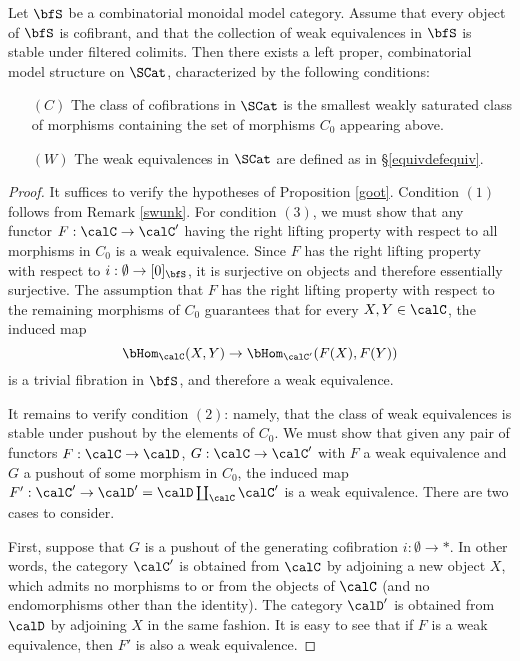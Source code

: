 \begin{Simplicial Categories}
\begin{proposition}\label{enrichcatper}
Let $\bfS$ be a combinatorial monoidal model category. Assume that every object of
$\bfS$ is cofibrant, and that the collection of weak equivalences in $\bfS$ is stable
under filtered colimits. Then
there exists a left proper, combinatorial model structure on $\SCat$, characterized by the following
conditions:
\begin{itemize}
\item[$(C)$] The class of cofibrations in $\SCat$ is the smallest weakly saturated class of morphisms
containing the set of morphisms $C_0$ appearing above.
\item[$(W)$] The weak equivalences in $\SCat$ are defined as in \S \ref{equivdefequiv}.
\end{itemize}
\end{proposition}

\begin{proof}
It suffices to verify the hypotheses of Proposition \ref{goot}. Condition $(1)$ follows from
Remark \ref{swunk}. For condition $(3)$, we must show that any functor $F: \calC \rightarrow \calC'$ having the right lifting property with respect to all morphisms in $C_0$ is a weak equivalence. Since $F$ has the right lifting property with respect to $i: \emptyset \rightarrow [0]_{\bfS}$, it is surjective on objects and therefore essentially surjective. The assumption that $F$ has the right lifting property with respect to the remaining morphisms of $C_0$ guarantees that for every $X, Y \in \calC$, the induced map
$$\bHom_{\calC}(X,Y) \rightarrow \bHom_{\calC'}(F(X),F(Y))$$ is a trivial fibration in
$\bfS$, and therefore a weak equivalence.

It remains to verify condition $(2)$: namely, that the class of weak equivalences is stable under pushout by the elements of $C_0$. We must show that given any pair of functors
$F: \calC \rightarrow \calD$, $G: \calC \rightarrow \calC'$ with $F$ a weak equivalence and $G$ a pushout of some morphism in $C_0$, the induced map $F': \calC' \rightarrow \calD' = \calD \coprod_{\calC} \calC'$ is a weak equivalence. There are two cases to consider.

First, suppose that $G$ is a pushout of the generating cofibration $i: \emptyset \rightarrow \ast$. In other words, the category $\calC'$ is obtained from $\calC$ by adjoining a new object $X$, which admits no morphisms to or from the objects of $\calC$ (and no endomorphisms other than the identity). The category $\calD'$ is obtained from $\calD$ by adjoining $X$ in the same fashion. It is easy to see that if $F$ is a weak equivalence, then $F'$ is also a weak equivalence.


\end{proof}
\end{Simplicial Categories}
